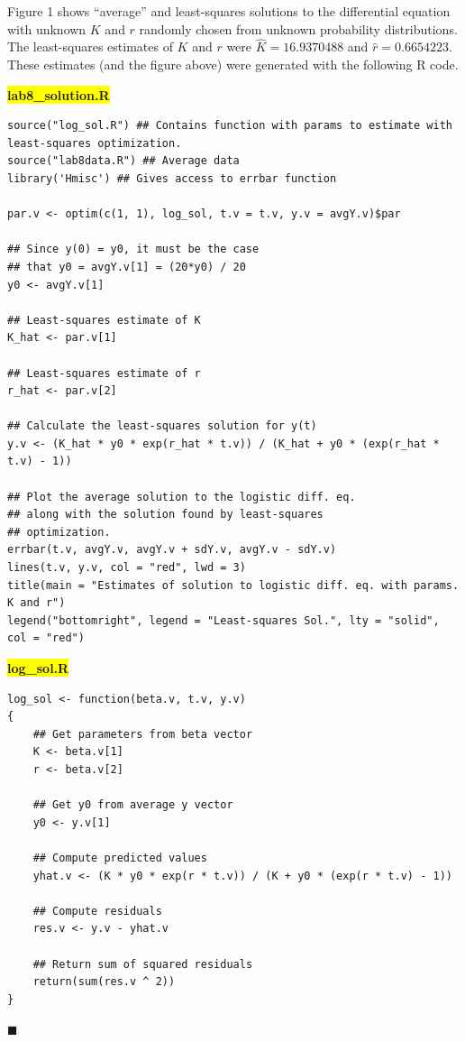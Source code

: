 \documentclass[11pt]{article}
\newcommand{\mybox}{%
    \collectbox{%
        \setlength{\fboxsep}{2pt}%
        \fbox{\BOXCONTENT}%
    }%
}
\begin{document}
\noindent Figure 1 shows ``average'' and least-squares solutions to the differential equation with unknown $K$ and $r$ randomly chosen from unknown probability distributions. The least-squares estimates of $K$ and $r$ were $\hat{K} = 16.9370488$ and $\hat{r} = 0.6654223$. These estimates (and the figure above) were generated with the following R code.

\pagebreak

\noindent\mybox{\colorbox{yellow}{\textbf{lab8\_solution.R}}}\hspace{3mm}\hrulefill
\begin{lstlisting}
source("log_sol.R") ## Contains function with params to estimate with least-squares optimization.
source("lab8data.R") ## Average data  
library('Hmisc') ## Gives access to errbar function

par.v <- optim(c(1, 1), log_sol, t.v = t.v, y.v = avgY.v)$par

## Since y(0) = y0, it must be the case
## that y0 = avgY.v[1] = (20*y0) / 20
y0 <- avgY.v[1]

## Least-squares estimate of K
K_hat <- par.v[1]

## Least-squares estimate of r
r_hat <- par.v[2]

## Calculate the least-squares solution for y(t)
y.v <- (K_hat * y0 * exp(r_hat * t.v)) / (K_hat + y0 * (exp(r_hat * t.v) - 1))

## Plot the average solution to the logistic diff. eq.
## along with the solution found by least-squares 
## optimization.
errbar(t.v, avgY.v, avgY.v + sdY.v, avgY.v - sdY.v)
lines(t.v, y.v, col = "red", lwd = 3)
title(main = "Estimates of solution to logistic diff. eq. with params. K and r")
legend("bottomright", legend = "Least-squares Sol.", lty = "solid", col = "red")
\end{lstlisting}

\vspace{10mm}

\noindent\mybox{\colorbox{yellow}{\textbf{log\_sol.R}}}\hspace{3mm}\hrulefill
\begin{lstlisting}
log_sol <- function(beta.v, t.v, y.v)
{
	## Get parameters from beta vector
	K <- beta.v[1]
	r <- beta.v[2]
	
	## Get y0 from average y vector
	y0 <- y.v[1]	

	## Compute predicted values	
	yhat.v <- (K * y0 * exp(r * t.v)) / (K + y0 * (exp(r * t.v) - 1))
	
	## Compute residuals
	res.v <- y.v - yhat.v

	## Return sum of squared residuals	
	return(sum(res.v ^ 2))
}
\end{lstlisting}

\hfill$\blacksquare$


\vfill
\begin{center}
\end{center}
\begin{center}
\vspace{-0.6cm}
\hrulefill \\
\vspace{-0.7cm}
\hrulefill
\end{center}
\end{document}

